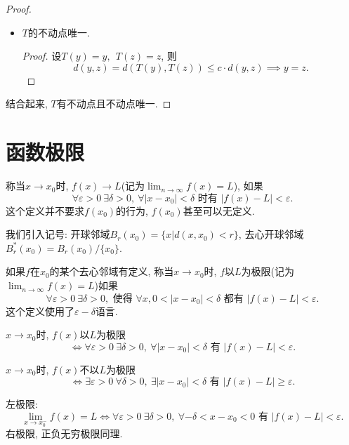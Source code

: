 \begin{proof}
\begin{itemize}
        \item $T$的不动点唯一.
        \begin{proof}
            设$T(y) = y, \ \ T(z) = z$, 则
            \begin{equation}
              d(y,z) = d(T(y),T(z)) \le c\cdot d(y,z) \implies y=z.
            \end{equation}
        \end{proof}
    \end{itemize}
    结合起来, $T$有不动点且不动点唯一.
\end{proof}

\section{函数极限}
\begin{definition}
    称当$x\to x_0$时, $f(x) \to L$(记为$\lim_{n \to \infty} f(x) = L$), 如果
    \begin{equation}
      \forall \varepsilon > 0 \ \exists \delta > 0 ,\ \forall  |x-x_0| < \delta \text{ 时有 }|f(x) - L|<\varepsilon.
    \end{equation}
    这个定义并不要求$f(x_0)$的行为, $f(x_0)$甚至可以无定义.
\end{definition}

我们引入记号: 
开球邻域$B_{r}(x_0) = \{ x | d(x,x_0) <r \}$,
去心开球邻域$B_{r}^{*} (x_0) = B_{r}(x_0)/\{ x_0 \}$.

\begin{definition}
    如果$f$在$x_0$的某个去心邻域有定义, 称当$x\to x_0$时, $f$以$L$为极限(记为$\displaystyle \lim_{n \to \infty} f(x) = L$)如果 
    \begin{equation}
      \forall \varepsilon >0 \ \exists \delta > 0, \text{ 使得 } \forall x, 0 < |x-x_0| < \delta \text{ 都有 } |f(x) - L| < \varepsilon. 
    \end{equation}
    这个定义使用了$\varepsilon-\delta$语言.
\end{definition}

$x\to x_0$时, $f(x)$以$L$为极限
$$
\iff \forall \varepsilon > 0 \ \exists \delta > 0, \ \forall |x-x_0|< \delta \text{ 有 }|f(x) - L| < \varepsilon.
$$

$x\to x_0$时, $f(x)$不以$L$为极限
$$
\iff \exists  \varepsilon > 0 \ \forall  \delta > 0, \ \exists |x-x_0|< \delta \text{ 有 }|f(x) - L| \ge \varepsilon.
$$

\begin{definition}
    左极限:
    \begin{equation}
      \lim_{x \to x_0^{-}} f(x) = L \iff \forall \varepsilon > 0 \ \exists \delta > 0 , \ \forall - \delta < x-x_0 < 0 \text{ 有 } |f(x) - L| < \varepsilon. 
    \end{equation}
    右极限, 正负无穷极限同理.

\end{definition}

